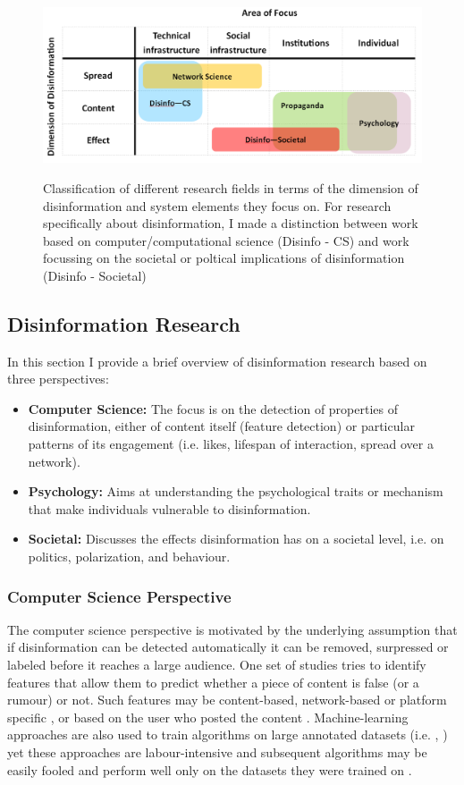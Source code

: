 \documentclass[10pt,a4paper]{article}
\begin{document}
\begin{figure}
	\includegraphics[scale=0.5]{litanalysis.png}
	\label{img:litanalysis}
	\caption{Classification of different research fields in terms of the dimension of disinformation and system elements they focus on. For research specifically about disinformation, I made a distinction between work based on computer/computational science (Disinfo - CS) and work focussing on the societal or poltical implications of disinformation (Disinfo - Societal)}
\end{figure}

\subsection{Disinformation Research}
In this section I provide a brief overview of disinformation research based on three perspectives:
\begin{itemize}
	\item \textbf{Computer Science:} The focus is on the detection of properties of disinformation, either of content itself (feature detection) or particular patterns of its engagement (i.e. likes, lifespan of interaction, spread over a network). 
	\item \textbf{Psychology:} Aims at understanding the psychological traits or mechanism that make individuals vulnerable to disinformation. 
	\item \textbf{Societal:} Discusses the effects disinformation has on a societal level, i.e. on politics, polarization, and behaviour.
\end{itemize}

\subsubsection{Computer Science Perspective}
The computer science perspective is motivated by the underlying assumption that if disinformation can be detected automatically it can be removed, surpressed or labeled before it reaches a large audience. One set of studies tries to identify features that allow them to predict whether a piece of content is false (or a rumour) or not. Such features may be content-based, network-based or platform specific  \citep{qazvinian2011rumor}, or based on the user who posted the content \citep{liu2015real}. Machine-learning approaches are also used to train algorithms on large annotated datasets (i.e. \cite{wang2017liar}, \cite{mitra2015credbank} \cite{papadopoulou2019corpus}) yet these approaches are labour-intensive and subsequent algorithms may be easily fooled and perform well only on the datasets they were trained on \citep{grondahl2018all}. \\
\end{document}
